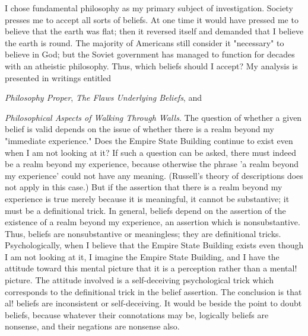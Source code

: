 \documentclass[10pt,twoside]{memoir}
\newcommand{\essaytitle}[1]{
	\emph{#1}}
\begin{document}
I chose fundamental philosophy as my primary subject of investigation. 
Society presses me to accept all sorts of beliefs. At one time it would have 
pressed me to believe that the earth was flat; then it reversed itself and 
demanded that I believe the earth is round. The majority of Americans still 
consider it "necessary" to believe in God; but the Soviet government has 
managed to function for decades with an atheistic philosophy. Thus, which 
beliefs should I accept? My analysis is presented in writings entitled 
\essaytitle{Philosophy Proper}, \essaytitle{The Flaws Underlying Beliefs}, and 
\essaytitle{Philosophical Aspects of Walking Through Walls}. 
The question of whether a given belief is valid 
depends on the issue of whether there is a realm beyond my "immediate 
experience." Does the Empire State Building continue to exist even when I 
am not looking at it? If such a question can be asked, there must indeed be 
a realm beyond my experience, because otherwise the phrase 'a realm 
beyond my experience' could not have any meaning. (Russell's theory of 
descriptions does not apply in this case.) But if the assertion that there is a 
realm beyond my experience is true merely because it is meaningful, it 
cannot be substantive; it must be a definitional trick. In general, beliefs 
depend on the assertion of the existence of a realm beyond my experience, 
an assertion which is nonsubstantive. Thus, beliefs are nonsubstantive or 
meaningless; they are definitional tricks. Psychologically, when I believe that 
the Empire State Building exists even though I am not looking at it, I 
imagine the Empire State Building, and I have the attitude toward this 
mental picture that it is a perception rather than a mental! picture. The 
attitude involved is a self-deceiving psychological trick which corresponds to 
the definitional trick in the belief assertion. The conclusion is that al! beliefs 
are inconsistent or self-deceiving. It would be beside the point to doubt 
beliefs, because whatever their connotations may be, logically beliefs are 
nonsense, and their negations are nonsense also. 
\end{document}
